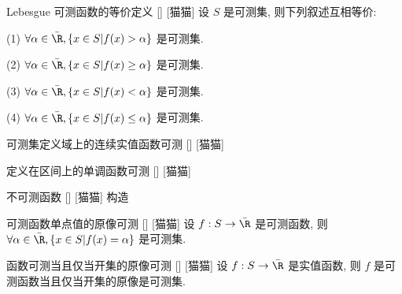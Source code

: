 \documentclass[UTF8]{ctexart}
\begin{document}
            \begin{ppt}
                {Lebesgue 可测函数的等价定义}
                []
                [猫猫]
                设 \(S\) 是可测集, 则下列叙述互相等价: 

                (1) \(\forall\alpha\in\bar{\R}, \{x\in S|f(x)>\alpha\}\) 是可测集. 

                (2) \(\forall\alpha\in\bar{\R}, \{x\in S|f(x)\geq\alpha\}\) 是可测集. 

                (3) \(\forall\alpha\in\bar{\R}, \{x\in S|f(x)<\alpha\}\) 是可测集. 

                (4) \(\forall\alpha\in\bar{\R}, \{x\in S|f(x)\leq\alpha\}\) 是可测集. 
            \end{ppt}
            
            \begin{xmp}
                {可测集定义域上的连续实值函数可测}
                []
                [猫猫]
            \end{xmp}
            
            \begin{xmp}
                {定义在区间上的单调函数可测}
                []
                [猫猫]
            \end{xmp}
            
            \begin{cxmp}
                {不可测函数}
                []
                [猫猫]
                构造
            \end{cxmp}
            
            \begin{ppt}
                {可测函数单点值的原像可测}
                []
                [猫猫]
                设 \(f:S\to\bar{\R}\) 是可测函数, 则 \(\forall\alpha\in\bar{\R}, \{x\in S|f(x)=\alpha\}\) 是可测集. 
            \end{ppt}
            
            \begin{ppt}
                {函数可测当且仅当开集的原像可测}
                []
                [猫猫]
                设 \(f:S\to\bar{\R}\) 是实值函数, 则 \(f\) 是可测函数当且仅当开集的原像是可测集. 
            \end{ppt}
            
\end{document}
